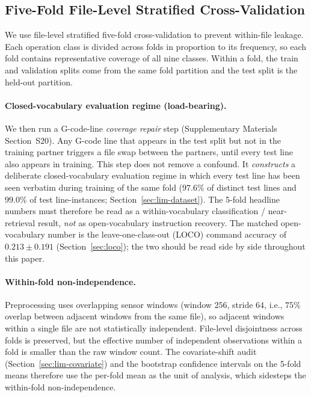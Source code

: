 \documentclass[sensors,article,submit,moreauthors,pdftex]{Definitions/mdpi}
\begin{document}
\subsection{Five-Fold File-Level Stratified Cross-Validation}
\label{sec:cv}

We use file-level stratified five-fold cross-validation to prevent within-file leakage. Each operation class is divided across folds in proportion to its frequency, so each fold contains representative coverage of all nine classes. Within a fold, the train and validation splits come from the same fold partition and the test split is the held-out partition.

\paragraph{Closed-vocabulary evaluation regime (load-bearing).} We then run a G-code-line \emph{coverage repair} step (Supplementary Materials Section~S20). Any G-code line that appears in the test split but not in the training partner triggers a file swap between the partners, until every test line also appears in training. This step does not remove a confound. It \emph{constructs} a deliberate closed-vocabulary evaluation regime in which every test line has been seen verbatim during training of the same fold ($97.6\%$ of distinct test lines and $99.0\%$ of test line-instances; Section~\ref{sec:lim-dataset}). The 5-fold headline numbers must therefore be read as a within-vocabulary classification / near-retrieval result, \emph{not} as open-vocabulary instruction recovery. The matched open-vocabulary number is the leave-one-class-out (LOCO) command accuracy of $0.213 \pm 0.191$ (Section~\ref{sec:loco}); the two should be read side by side throughout this paper.

\paragraph{Within-fold non-independence.} Preprocessing uses overlapping sensor windows (window $256$, stride $64$, i.e., $75\%$ overlap between adjacent windows from the same file), so adjacent windows within a single file are not statistically independent. File-level disjointness across folds is preserved, but the effective number of independent observations within a fold is smaller than the raw window count. The covariate-shift audit (Section~\ref{sec:lim-covariate}) and the bootstrap confidence intervals on the 5-fold means therefore use the per-fold mean as the unit of analysis, which sidesteps the within-fold non-independence.
\end{document}
